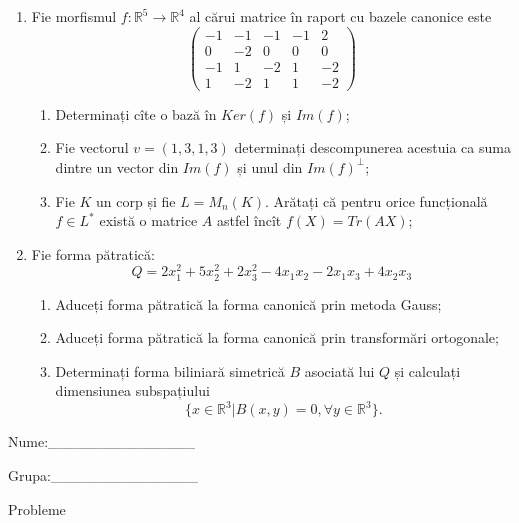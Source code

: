 \documentclass{article}
\begin{document}
\begin{enumerate}
 \item Fie morfismul $f:\mathbb{R}^5 \to \mathbb{R}^4$ al cărui matrice în raport cu bazele canonice este
$$\begin{pmatrix}
-1&-1&-1&-1&2\\
0&-2&0&0&0\\
-1&1&-2&1&-2\\
1&-2&1&1&-2
\end{pmatrix}$$

\begin{enumerate}
\item Determinați cîte o bază în $Ker(f)$ și $Im(f)$;
\item Fie vectorul $v=(1,3,1,3)$ determinați descompunerea acestuia ca suma dintre un vector din $Im(f)$ și unul din $Im(f)^\perp$;
\item Fie $K$ un corp și fie $L=M_n(K)$. Arătați că pentru orice funcțională $f \in L^*$ există o matrice $A$ astfel încît $f(X)=Tr(AX)$;
\end{enumerate}
\item Fie forma pătratică:
$$Q= 2x_1^2+5x_2^2+2x_3^2-4x_1x_2-2x_1x_3+4x_2x_3$$

\begin{enumerate}
\item Aduceți forma pătratică la forma canonică prin metoda Gauss;
\item Aduceți forma pătratică la forma canonică prin transformări ortogonale;
\item Determinați forma biliniară simetrică $B$ asociată lui $Q$ și calculați dimensiunea subspațiului
$$\{x \in \mathbb{R}^3 | B(x,y)=0,\forall y \in \mathbb{R}^3\}.$$

\end{enumerate}
\end{enumerate}
\newpage
\begin{flushright}
Nume:\_\_\_\_\_\_\_\_\_\_\_\_\_\_
 
 
Grupa:\_\_\_\_\_\_\_\_\_\_\_\_\_\_
\end{flushright}
\begin{center}
\vspace{2cm}
{\Large Probleme}
\vspace{2cm}
\end{center}
\end{document}
